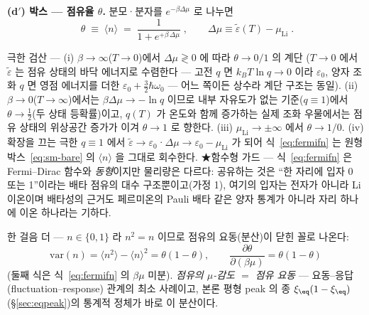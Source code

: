 \textbf{(d$'$) 박스 --- 점유율 $\theta$.} 분모·분자를 $e^{-\beta\Delta\mu}$ 로 나누면
\begin{equation}
\boxed{\;\theta\;\equiv\;\langle n\rangle\;=\;\frac{1}{1+e^{+\beta\,\Delta\mu}}\;,
\qquad \Delta\mu\equiv\tilde\varepsilon(T)-\mu_\mathrm{Li}\;.}
\label{eq:fermifn}
\end{equation}
\begin{verifybox}
극한 검산 --- (i) $\beta\to\infty$($T\to0$)에서 $\Delta\mu\gtrless0$ 에 따라 $\theta\to0/1$ 의 계단
($T\to0$ 에서 $\tilde\varepsilon$ 는 점유 상태의 바닥 에너지로 수렴한다 --- 고전 $q$ 면 $k_BT\ln q\to0$
이라 $\varepsilon_0$, 양자 조화 $q$ 면 영점 에너지를 더한 $\varepsilon_0+\tfrac32\hbar\omega_0$ --- 어느
쪽이든 상수라 계단 구조는 동일). (ii) $\beta\to0$($T\to\infty$)에서는 $\beta\Delta\mu\to-\ln q$ 이므로
내부 자유도가 없는 기준($q\equiv1$)에서 $\theta\to\tfrac12$(두 상태 등확률)이고, $q(T)$ 가 온도와 함께
증가하는 실제 조화 우물에서는 점유 상태의 위상공간 증가가 이겨 $\theta\to1$ 로 향한다.
(iii) $\mu_\mathrm{Li}\to\pm\infty$ 에서 $\theta\to1/0$. (iv) 확장을 끄는 극한 $q\equiv1$ 에서
$\tilde\varepsilon\to\varepsilon_0$·$\Delta\mu\to\varepsilon_0-\mu_\mathrm{Li}$ 가 되어
식~\eqref{eq:fermifn} 는 원형 박스~\eqref{eq:sm-bare} 의 $\langle n\rangle$ 을 그대로 회수한다.
★함수형 가드 --- 식~\eqref{eq:fermifn} 은 Fermi--Dirac 함수와 \emph{동형}이지만 물리량은 다르다:
공유하는 것은 ``한 자리에 입자 0 또는 1''이라는 배타 점유의 대수 구조뿐이고(가정 1), 여기의 입자는
전자가 아니라 Li 이온이며 배타성의 근거도 페르미온의 Pauli 배타 같은 양자 통계가 아니라 자리 하나에
이온 하나라는 기하다.
\end{verifybox}

한 걸음 더 --- $n\in\{0,1\}$ 라 $n^2=n$ 이므로 점유의 요동(분산)이 닫힌 꼴로 나온다:
\begin{equation}
\mathrm{var}(n)=\langle n^2\rangle-\langle n\rangle^2=\theta(1-\theta),
\qquad
\frac{\partial\theta}{\partial(\beta\mu)}=\theta(1-\theta)
\label{eq:sm-flucres}
\end{equation}
(둘째 식은 식~\eqref{eq:fermifn} 의 $\beta\mu$ 미분). \emph{점유의 $\mu$-감도 $=$ 점유 요동} --- 요동--응답
(fluctuation--response) 관계의 최소 사례이고, 본론 평형 peak 의 종 $\xi_\eq(1-\xi_\eq)$(\S\ref{sec:eqpeak})의
통계적 정체가 바로 이 분산이다.


